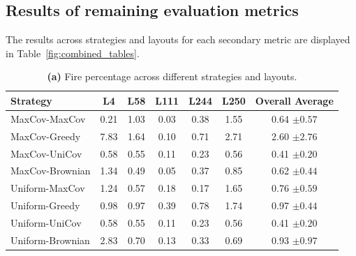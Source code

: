 \documentclass{article}
\begin{document}
\newpage \subsection{Results of remaining evaluation metrics}
The results across strategies and layouts for each secondary metric are displayed in Table~\ref{fig:combined_tables}.

\begin{table}[htbp]
\centering

\begin{minipage}{\textwidth}
\centering
\small
\setlength{\tabcolsep}{4pt}
\begin{tabular}{lccccc c}
\toprule
\textbf{Strategy} & \textbf{L4} & \textbf{L58} & \textbf{L111} & \textbf{L244} & \textbf{L250} & \textbf{Overall Average} \\
\midrule
MaxCov-MaxCov     & 0.21  & 1.03 & 0.03  & 0.38 & 1.55 & 0.64 $\pm 0.57$ \\
MaxCov-Greedy     & 7.83  & 1.64 & 0.10  & 0.71 & 2.71 & 2.60 $\pm 2.76$ \\
MaxCov-UniCov     & 0.58  & 0.55 & 0.11  & 0.23 & 0.56 & 0.41 $\pm 0.20$ \\
MaxCov-Brownian   & 1.34  & 0.49 & 0.05  & 0.37 & 0.85 & 0.62 $\pm 0.44$ \\
Uniform-MaxCov    & 1.24  & 0.57 & 0.18  & 0.17 & 1.65 & 0.76 $\pm 0.59$ \\
Uniform-Greedy    & 0.98  & 0.97 & 0.39  & 0.78 & 1.74 & 0.97 $\pm 0.44$ \\
Uniform-UniCov    & 0.58  & 0.55 & 0.11  & 0.23 & 0.56 & 0.41 $\pm 0.20$ \\
Uniform-Brownian  & 2.83  & 0.70 & 0.13  & 0.33 & 0.69 & 0.93 $\pm 0.97$ \\
\bottomrule
\end{tabular}
\caption*{\textbf{(a)} Fire percentage across different strategies and layouts.}
\vspace{1em}
\end{minipage}


\end{table}
\end{document}
